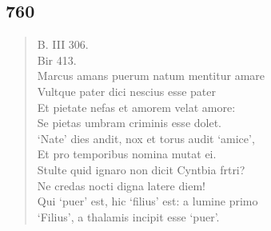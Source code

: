 \documentclass[11pt, a4paper]{report}
\begin{document}
            \subsection*{760}
      \begin{verse}
      B. III 306. \\ Bir 413. \\ Marcus amans puerum natum mentitur amare \\ Vultque pater dici nescius esse pater \\ Et pietate nefas et amorem velat amore: \\ Se pietas umbram criminis esse dolet. \\ ‘Nate’ dies andit, nox et torus audit ‘amice’, \\ Et pro temporibus nomina mutat ei. \\ Stulte quid ignaro non dicit Cyntbia frtri? \\ Ne credas nocti digna latere diem! \\ Qui ‘puer’ est, hic ‘filius’ est: a lumine primo \\ ‘Filius’, a thalamis incipit esse ‘puer’. \\ 
      \end{verse}
  
\end{document}
